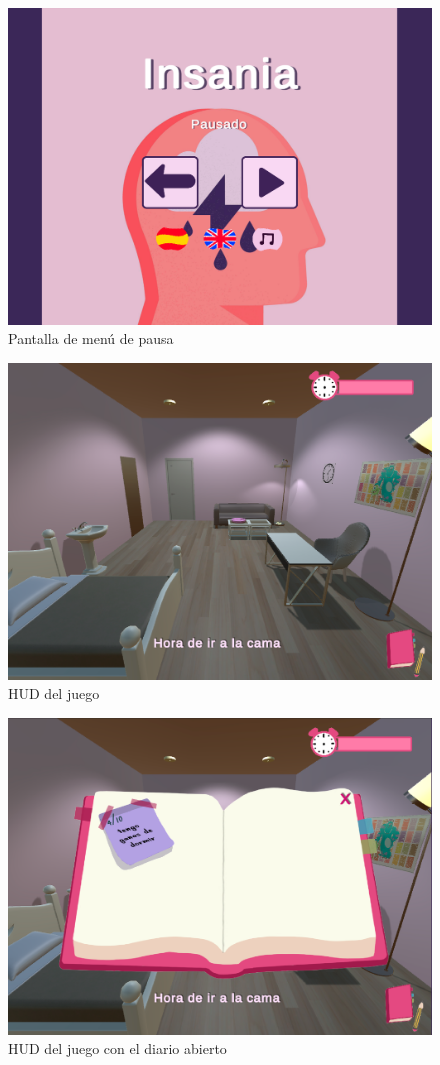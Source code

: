 \documentclass[12pt, a4paper,twoside,titlepage]{book}
\begin{document}
\begin{figure}
	\centering
	\includegraphics[width=.8\linewidth]{TGF/Artes/Pausa.png}
	\caption{Pantalla de menú de pausa}
	\label{fig:UXPausa}
\end{figure}

\begin{figure}
	\centering
	\includegraphics[width=.8\linewidth]{TGF/Artes/UX basic.png}
	\caption{HUD del juego}
	\label{fig:UXHUD}
\end{figure}

\begin{figure}
	\centering
	\includegraphics[width=.8\linewidth]{TGF/Artes/UX diario abierto.png}
	\caption{HUD del juego con el diario abierto}
	\label{fig:UXHUD2}
\end{figure}
\end{document}
